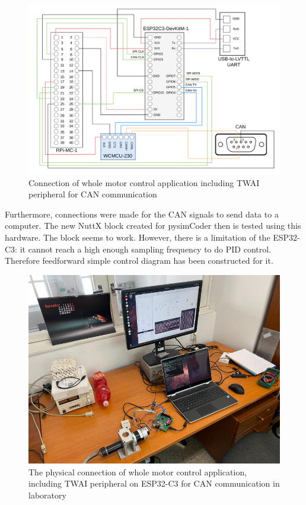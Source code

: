 \documentclass{ctuthesis}
\begin{document}
 \begin{figure}[htb]
 \includegraphics[width=1\textwidth]{images/fpga.pdf}
 \caption{Connection of whole motor control application including TWAI peripheral for CAN communication \cite{thesis-beqiri}}
 \end{figure}
 
Furthermore, connections were made for the CAN signals to send data to a computer. The new NuttX block created for pysimCoder then is tested using this hardware. The block seems to work. However, there is a limitation of the ESP32-C3: it cannot reach a high enough sampling frequency to do PID control. Therefore feedforward simple control diagram has been constructed for it.

 \clearpage
 \begin{figure}[htb]
 \includegraphics[width=1\textwidth]{images/motor_control.pdf}
 \caption{The physical connection of whole motor control application, including TWAI peripheral on ESP32-C3 for CAN communication in laboratory}
 \end{figure}
\end{document}
